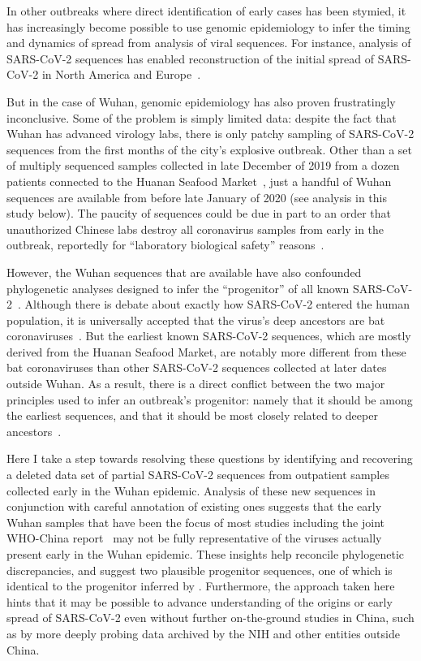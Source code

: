 \documentclass[9pt,twocolumn,twoside]{gsajnl_modified}
\begin{document}
In other outbreaks where direct identification of early cases has been stymied, it has increasingly become possible to use genomic epidemiology to infer the timing and dynamics of spread from analysis of viral sequences.
For instance, analysis of SARS-CoV-2 sequences has enabled reconstruction of the initial spread of SARS-CoV-2 in North America and Europe~\citep{bedford2020cryptic, worobey2020emergence, deng2020genomic, fauver2020coast}.

But in the case of Wuhan, genomic epidemiology has also proven frustratingly inconclusive.
Some of the problem is simply limited data: despite the fact that Wuhan has advanced virology labs, there is only patchy sampling of SARS-CoV-2 sequences from the first months of the city's explosive outbreak.
Other than a set of multiply sequenced samples collected in late December of 2019 from a dozen patients connected to the Huanan Seafood Market~\citep{WHO2021origins}, just a handful of Wuhan sequences are available from before late January of 2020 (see analysis in this study below).
The paucity of sequences could be due in part to an order that unauthorized Chinese labs destroy all coronavirus samples from early in the outbreak, reportedly for ``laboratory biological safety'' reasons~\citep{pinghui2020SCMP}.

However, the Wuhan sequences that are available have also confounded phylogenetic analyses designed to infer the ``progenitor'' of all known SARS-CoV-2~\citep{kumar2021evolutionary}.
Although there is debate about exactly how SARS-CoV-2 entered the human population, it is universally accepted that the virus's deep ancestors are bat coronaviruses~\citep{lytras2021exploring}.
But the earliest known SARS-CoV-2 sequences, which are mostly derived from the Huanan Seafood Market, are notably more different from these bat coronaviruses than other SARS-CoV-2 sequences collected at later dates outside Wuhan.
As a result, there is a direct conflict between the two major principles used to infer an outbreak's progenitor: namely that it should be among the earliest sequences, and that it should be most closely related to deeper ancestors~\citep{pipes2021assessing}.

Here I take a step towards resolving these questions by identifying and recovering a deleted data set of partial SARS-CoV-2 sequences from outpatient samples collected early in the Wuhan epidemic.
Analysis of these new sequences in conjunction with careful annotation of existing ones suggests that the early Wuhan samples that have been the focus of most studies including the joint WHO-China report~\citep{WHO2021origins} may not be fully representative of the viruses actually present early in the Wuhan epidemic.
These insights help reconcile phylogenetic discrepancies, and suggest two plausible progenitor sequences, one of which is identical to the progenitor inferred by \citet{kumar2021evolutionary}.
Furthermore, the approach taken here hints that it may be possible to advance understanding of the origins or early spread of SARS-CoV-2 even without further on-the-ground studies in China, such as by more deeply probing data archived by the NIH and other entities outside China.
\end{document}
